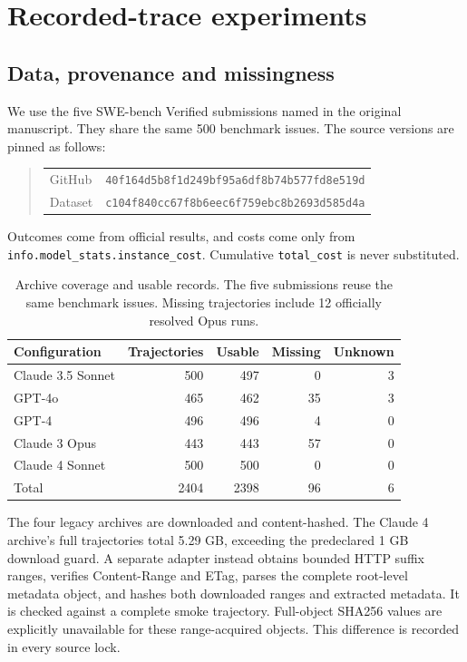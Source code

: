 \documentclass[11pt]{article}
\begin{document}
\section{Recorded-trace experiments}\label{sec:methods}
\subsection{Data, provenance and missingness}
We use the five SWE-bench Verified submissions named in the original manuscript. They share the same 500 benchmark issues. The source versions are pinned as follows:
\begin{quote}\small\begin{tabular}{@{}ll@{}}
GitHub & \texttt{40f164d5b8f1d249bf95a6df8b74b577fd8e519d} \\
Dataset & \texttt{c104f840cc67f8b6eec6f759ebc8b2693d585d4a}
\end{tabular}\end{quote}
 Outcomes come from official results, and costs come only from \texttt{info.model\_stats.instance\_cost}. Cumulative \texttt{total\_cost} is never substituted.
\begin{table}[tbp]\centering\small
\caption{Archive coverage and usable records. The five submissions reuse the same benchmark issues. Missing trajectories include 12 officially resolved Opus runs.}\label{tab:data}
\begin{tabular}{lrrrr}
\toprule
Configuration & Trajectories & Usable & Missing & Unknown \\ \midrule
Claude 3.5 Sonnet & 500 & 497 & 0 & 3 \\
GPT-4o & 465 & 462 & 35 & 3 \\
GPT-4 & 496 & 496 & 4 & 0 \\
Claude 3 Opus & 443 & 443 & 57 & 0 \\
Claude 4 Sonnet & 500 & 500 & 0 & 0 \\
Total & 2404 & 2398 & 96 & 6 \\
\bottomrule\end{tabular}\end{table}
The four legacy archives are downloaded and content-hashed. The Claude 4 archive's full trajectories total 5.29 GB, exceeding the predeclared 1 GB download guard. A separate adapter instead obtains bounded HTTP suffix ranges, verifies Content-Range and ETag, parses the complete root-level metadata object, and hashes both downloaded ranges and extracted metadata. It is checked against a complete smoke trajectory. Full-object SHA256 values are explicitly unavailable for these range-acquired objects. This difference is recorded in every source lock.
\end{document}
